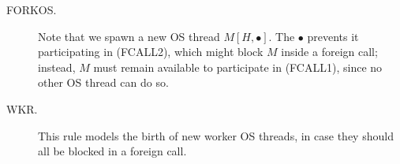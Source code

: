 \documentclass{article}
\begin{document}
\begin{description}
\item[FORKOS.]  Note that we spawn a new OS thread $M[H,\bullet]$.  The $\bullet$ prevents it
participating in (FCALL2), which might block $M$ inside a foreign call; instead, $M$ must
remain available to participate in (FCALL1), since no other OS thread can do so.

\item[WKR.] This rule models the birth of new worker OS threads, in case they should
all be blocked in a foreign call.
\end{description}
\end{document}
